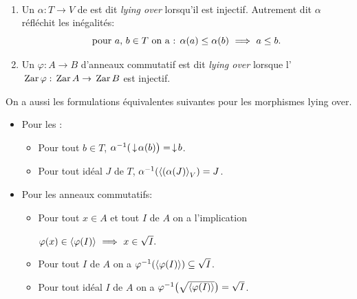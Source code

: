 \begin{definition}\label{defiLYO}~
%
\begin{enumerate}
%
\item Un \homo $\alpha: T\to V$ de \trdis est dit \emph{lying over} lorsqu'il est injectif. Autrement dit $\alpha$ réfléchit les inégalités: 
$$\hbox{pour } a ,\, b\in T\hbox{ on a : }
 \alpha(a)\leq\alpha(b) \ \Longrightarrow\ a\leq b.$$
%
\item Un \homo $\varphi: A\to B$ d'anneaux
commutatif est dit \emph{lying over} lorsque
l'\homo  $\,{\rm Zar}\,\varphi:\,{\rm Zar}\, A\to\,{\rm Zar}\, B$ est injectif.
\end{enumerate}
\end{definition}

\begin{remark} \label{remLY} 
{\rm    On a aussi les formulations équivalentes suivantes pour les morphismes lying over.
\begin{itemize}
%
\item Pour les \trdis:
\begin{itemize}
%
\item Pour tout $b\in T$, $\alpha^{-1}(\,\downarrow\! \alpha(b)\big)=\,\downarrow\! b$.
%
\item Pour tout idéal $J$ de $ T$,  
$\alpha^{-1} (\left\langle{(\alpha(J)}\right\rangle_V)=J$.
\end{itemize}
%
\item Pour les anneaux commutatifs:
\begin{itemize}
%
\item Pour tout $x\in A$ et tout \itf $I$ de $ A$ on a
l'implication

\centerline{$\varphi(x)\in\left\langle{\varphi(I)}\right\rangle \
\Longrightarrow\ x\in\sqrt{I}.$}
%
\item  Pour tout \itf $I$ de $ A$ on a
$\varphi^{-1}(\left\langle{\varphi(I)}\right\rangle) \subseteq \sqrt{I}$.
%
\item   Pour tout idéal $I$ de $ A$ on a
$\varphi^{-1}\big(\sqrt{\left\langle{\varphi(I)}\right\rangle}\big)=\sqrt{I}$. 
\end{itemize}
\end{itemize}
}\end{remark}

